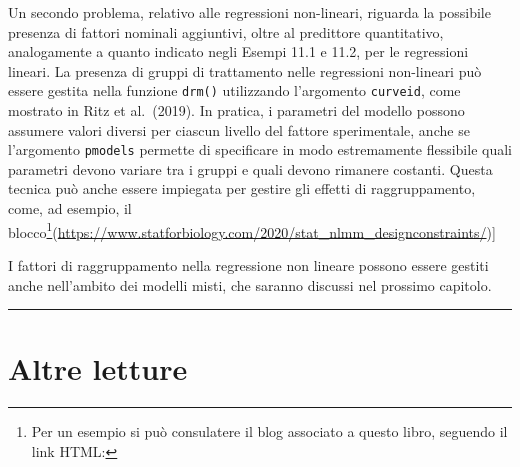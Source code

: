 \documentclass[
  12pt,
]{book}
\begin{document}
Un secondo problema, relativo alle regressioni non-lineari, riguarda la possibile presenza di fattori nominali aggiuntivi, oltre al predittore quantitativo, analogamente a quanto indicato negli Esempi 11.1 e 11.2, per le regressioni lineari. La presenza di gruppi di trattamento nelle regressioni non-lineari può essere gestita nella funzione \texttt{drm()} utilizzando l'argomento \texttt{curveid}, come mostrato in Ritz et al.~(2019). In pratica, i parametri del modello possono assumere valori diversi per ciascun livello del fattore sperimentale, anche se l'argomento \texttt{pmodels} permette di specificare in modo estremamente flessibile quali parametri devono variare tra i gruppi e quali devono rimanere costanti. Questa tecnica può anche essere impiegata per gestire gli effetti di raggruppamento, come, ad esempio, il blocco\footnote{Per un esempio si può consulatere il blog associato a questo libro, seguendo il link HTML:}(\url{https://www.statforbiology.com/2020/stat_nlmm_designconstraints/}){]}

I fattori di raggruppamento nella regressione non lineare possono essere gestiti anche nell'ambito dei modelli misti, che saranno discussi nel prossimo capitolo.

\begin{center}\rule{0.5\linewidth}{0.5pt}\end{center}

\hypertarget{altre-letture-10}{%
\section{Altre letture}\label{altre-letture-10}}
\end{document}
